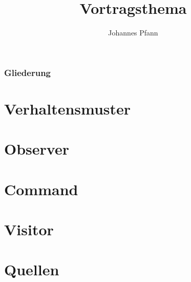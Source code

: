 \documentclass[compress]{beamer}
\author[Pfann]{%
  Johannes Pfann
}
\date{}
\institute[FAU Erlangen-Nürnberg]{
  Lehrstuhl für Software Engineering\\
  Friedrich-Alexander-Universität Erlangen-Nürnberg
}
\title{Vortragsthema}
\begin{document}
\frame{\titlepage} 

\begin{frame}
	\frametitle{Gliederung}
	\tableofcontents[hideallsubsections]
\end{frame}


\section[Verhaltensmuster]{Verhaltensmuster}


\section[Observer]{Observer}


\section[Command]{Command}


\section[Visitor]{Visitor}





\section[Quellen]{Quellen}

\end{document}
